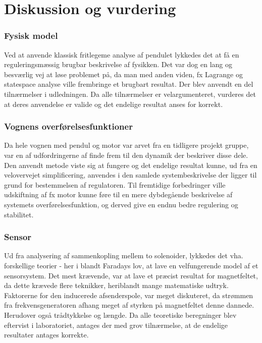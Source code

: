\chapter{Diskussion og vurdering}\label{kap:diskussion}

\subsection{Fysisk model}
Ved at anvende klassisk fritlegeme analyse af pendulet lykkedes det at få en reguleringsmæssig brugbar beskrivelse af fysikken. 
Det var dog en lang og besværlig vej at løse problemet på, da man med anden viden, fx Lagrange og statespace analyse ville frembringe et brugbart resultat.
Der blev anvendt en del tilnærmelser i udledningen. 
Da alle tilnærmelser er velargumenteret, vurderes det at deres anvendelse er valide og det endelige resultat anses for korrekt.   

\subsection{Vognens overførelsesfunktioner}
Da hele vognen med pendul og motor var arvet fra en tidligere projekt gruppe, var en af udfordringerne af finde frem til den dynamik der beskriver disse dele.
Den anvendt metode viste sig at fungere og det endelige resultat kunne, ud fra en velovervejet simplificering, anvendes i den samlede systembeskrivelse der ligger til grund for bestemmelsen af regulatoren.
Til fremtidige forbedringer ville udskiftning af fx motor kunne føre til en mere dybdegående beskrivelse af systemets overførelsesfunktion, og derved give en endnu bedre regulering og stabilitet.

\subsection{Sensor}
Ud fra analysering af sammenkopling mellem to solenoider, lykkedes det vha. forskellige teorier - her i blandt Faradays lov, at lave en velfungerende model af et sensorsystem. 
Det mest krævende, var at lave et præcist resultat for magnetfeltet, da dette krævede flere teknikker, heriblandt mange matematiske udtryk.
Faktorerne for den inducerede afsenderspole, var meget diskuteret, da strømmen fra frekvensgeneratoren afhang meget af styrken på magnetfeltet denne dannede.
Herudover også trådtykkelse og længde. 
Da alle teoretiske beregninger blev eftervist i laboratoriet, antages der med grov tilnærmelse, at de endelige resultater antages korrekte.


